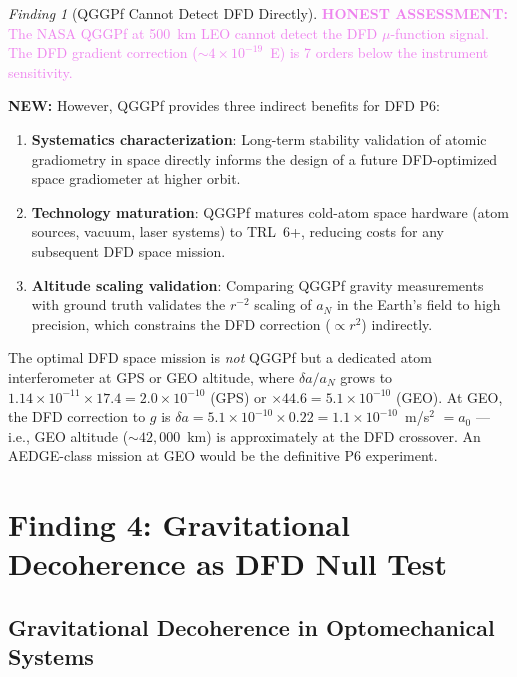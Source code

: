 \documentclass[11pt]{article}
\theoremstyle{definition}
\theoremstyle{remark}
\newtheorem{finding}[theorem]{Finding}
\newcommand{\ee}[1]{\times10^{#1}}
\newcommand{\azero}{a_0}
\newcommand{\honest}[1]{\textcolor{violet}{\textbf{HONEST ASSESSMENT:} #1}}
\newcommand{\newresult}[1]{\textcolor{green!50!black}{\textbf{NEW:} #1}}
\begin{document}
\begin{finding}[QGGPf Cannot Detect DFD Directly]
\label{find:qgg-honest}
\honest{The NASA QGGPf at 500~km LEO cannot detect the DFD
$\mu$-function signal. The DFD gradient correction
($\sim 4\ee{-19}$~E) is 7 orders below the instrument sensitivity.}

\newresult{However, QGGPf provides three indirect benefits for DFD P6:}
\begin{enumerate}[nosep]
\item \textbf{Systematics characterization}: Long-term stability
  validation of atomic gradiometry in space directly informs the
  design of a future DFD-optimized space gradiometer at higher orbit.
\item \textbf{Technology maturation}: QGGPf matures cold-atom
  space hardware (atom sources, vacuum, laser systems) to TRL~6+,
  reducing costs for any subsequent DFD space mission.
\item \textbf{Altitude scaling validation}: Comparing QGGPf
  gravity measurements with ground truth validates the $r^{-2}$
  scaling of $a_N$ in the Earth's field to high precision, which
  constrains the DFD correction ($\propto r^2$) indirectly.
\end{enumerate}

The optimal DFD space mission is \emph{not} QGGPf but a dedicated
atom interferometer at GPS or GEO altitude, where $\delta a/a_N$
grows to $1.14\ee{-11} \times 17.4 = 2.0\ee{-10}$ (GPS) or
$\times 44.6 = 5.1\ee{-10}$ (GEO). At GEO, the DFD correction
to $g$ is $\delta a = 5.1\ee{-10} \times 0.22 = 1.1\ee{-10}$~m/s$^2$
$= \azero$ --- i.e., GEO altitude ($\sim 42{,}000$~km) is
approximately at the DFD crossover. An AEDGE-class mission at GEO
would be the definitive P6 experiment.
\end{finding}

\section{Finding 4: Gravitational Decoherence as DFD Null Test}
\label{sec:decoherence}

\subsection{Gravitational Decoherence in Optomechanical Systems}
\end{document}
